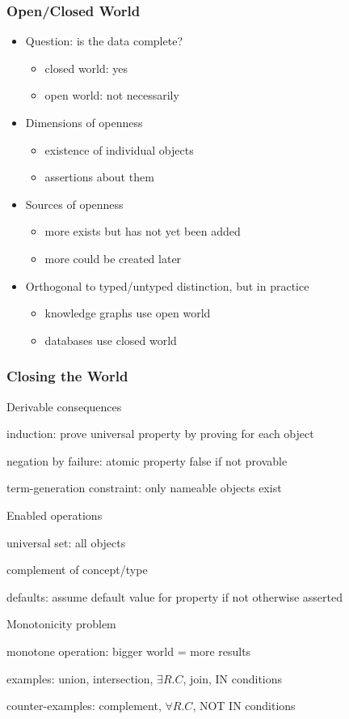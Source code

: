 \begin{frame}\frametitle{Open/Closed World}
\begin{itemize}
\item Question: is the data complete?
 \begin{itemize}
 \item closed world: yes
 \item open world: not necessarily
 \end{itemize}
\item Dimensions of openness
 \begin{itemize}
  \item existence of individual objects
  \item assertions about them
 \end{itemize}
\item Sources of openness
  \begin{itemize}
  \item more exists but has not yet been added
  \item more could be created later
  \end{itemize}
\item Orthogonal to typed/untyped distinction, but in practice
 \begin{itemize}
 \item knowledge graphs use open world
 \item databases use closed world
 \end{itemize}
\end{itemize}
\end{frame}

\begin{frame}\frametitle{Closing the World}
\begin{blockitems}{Derivable consequences}
 \item induction: prove universal property by proving for each object
 \item negation by failure: atomic property false if not provable
 \item term-generation constraint: only nameable objects exist
\end{blockitems}

\begin{blockitems}{Enabled operations}
 \item universal set: all objects
 \item complement of concept/type
 \item defaults: assume default value for property if not otherwise asserted
\end{blockitems}

\begin{blockitems}{Monotonicity problem}
 \item monotone operation: bigger world = more results
 \item examples: union, intersection, $\exists R.C$, join, IN conditions
 \item counter-examples: complement, $\forall R.C$, NOT IN conditions
\end{blockitems}
\end{frame}

